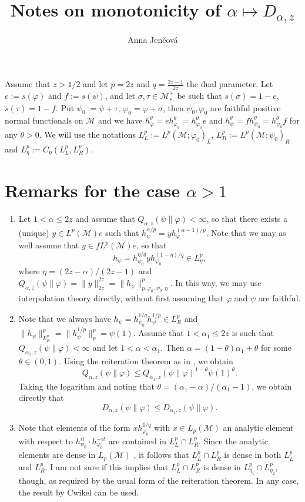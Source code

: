 \documentclass[12pt]{article}
\title{Notes on monotonicity of  $\alpha\mapsto D_{\alpha,z}$}
\author{Anna Jen\v cov\'a}
\theoremstyle{definition}
\theoremstyle{remark}
\def\Me{\mathcal M}
\begin{document}
\maketitle

Assume that $z>1/2$ and let $p=2z$ and $q=\frac{2z-1}{2z}$ the dual parameter. 
Let $e:=s(\varphi)$ and $f:=s(\psi)$, and let $\sigma,\tau\in \Me_*^+$ be such that
$s(\sigma)=1-e$, $s(\tau)=1-f$. Put $\psi_0:=\psi+\tau$, $\varphi_0=\varphi+\sigma$, then
$\psi_0,\varphi_0$ are faithful positive normal functionals on $\Me$ and we have
$h_{\varphi}^\theta=eh_{\varphi_0}^\theta=h_{\varphi_0}^\theta e$ and
$h_{\psi}^\theta=fh_{\psi_0}^\theta=h_{\psi_0}^\theta f$ for any $\theta>0$. 
We will use the notations $L^p_L:=L^p(\Me;\varphi_0)_L$, $L^p_R:=L^p(\Me;\psi_0)_R$ and 
$L^p_\eta:=C_\eta(L^p_L,L^p_R)$.


\section{Remarks for the case $\alpha>1$}

\begin{enumerate}
\item Let $1<\alpha\le 2z$ and assume that $Q_{\alpha,z}(\psi\|\varphi)<\infty$, so that there
exists a (unique) $y\in L^p(\Me)e$ such that
$h_\psi^{\alpha/p}=yh_\varphi^{(\alpha-1)/p}$. Note that we may as well assume that $y\in
fL^p(\Me)e$, so that
\[
h_\psi=h_{\psi_0}^{\eta/q}yh_{\varphi_0}^{(1-\eta)/q}\in L^p_\eta,
\]
where $\eta=(2z-\alpha)/(2z-1)$ and
$Q_{\alpha,z}(\psi\|\varphi)=\|y\|_{2z}^{2z}=\|h_\psi\|_{p,\varphi_0,\psi_0,\eta}^p$. In
this way, we may use interpolation theory directly, without first assuming that $\varphi$
and $\psi$ are faithful. 

\item Note that we always have $h_\psi=h_{\psi_0}^{1/q}h_\psi^{1/p}\in L^p_R$ and
$\|h_\psi\|_{L^p_R}^p=\|h_\psi^{1/p}\|_p^p=\psi(1)$. 
Assume that $1<\alpha_1\le 2z$ is such that $Q_{\alpha_1,z}(\psi\|\varphi)<\infty$ and let
$1<\alpha<\alpha_1$. Then $\alpha=(1-\theta)\alpha_1+\theta$ for some 
$\theta\in (0,1)$. Using the reiteration theorem as in \cite{FHnote6}, we obtain
\[
Q_{\alpha,z}(\psi\|\varphi)\le Q_{\alpha_1,z}(\psi\|\varphi)^{1-\theta}\psi(1)^{\theta}.
\]
Taking the logarithm and noting that $\theta=(\alpha_1-\alpha)/(\alpha_1-1)$, we obtain
directly that 
\[
D_{\alpha,z}(\psi\|\varphi)\le D_{\alpha_1,z}(\psi\|\varphi).
\]

\item Note that elements of the form $xh_{\varphi_0}^{1/q}$ with $x\in L_p(\Me)$ an
analytic element with respect to $h_{\psi_0}^{it}\cdot h_{\varphi_0}^{-it}$ are contained
in $L^p_L\cap L^p_R$. Since the analytic elements are dense in $L_p(\Me)$ \cite[Lemma
10.4]{kosaki1984applications}, it follows that $L^p_L\cap L^p_R$ is dense in both $L^p_L$
and $L^p_R$. I am not sure if this implies that $L^p_L\cap L^p_R$ is dense in
$L^p_{\eta_1}\cap L^p_{\eta_2}$, though, as required by the usual form of the reiteration
theorem. In any case, the result by Cwikel can be used.

\end{enumerate}
\end{document}
